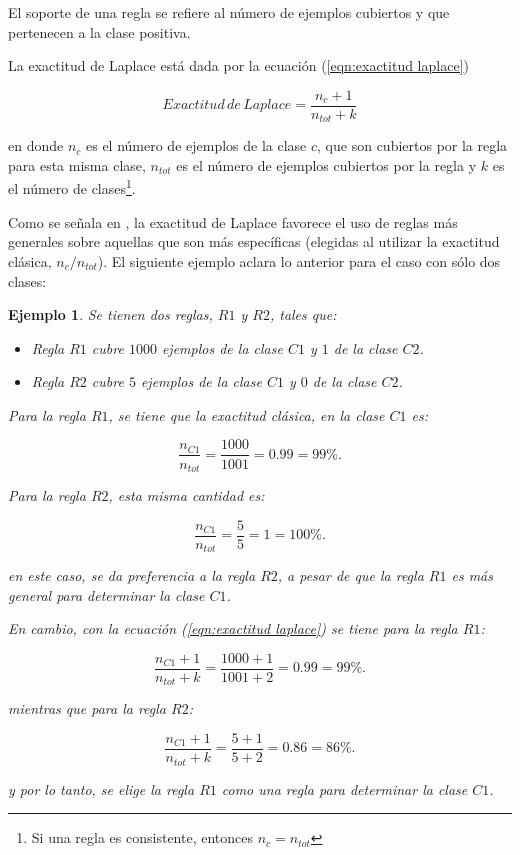 \documentclass[12pt]{report}
\theoremstyle{break}
\newtheorem{ejemplo}{Ejemplo}[chapter]
\theoremstyle{break}
\begin{document}
El soporte de una regla se refiere al número de ejemplos cubiertos y que pertenecen a la clase positiva.

La exactitud de Laplace está dada por la ecuación (\ref{eqn:exactitud laplace})

\begin{equation}\label{eqn:exactitud laplace}
Exactitud\,de\,Laplace = \dfrac{ n_{c} + 1 }{ n_{tot} + k }
\end{equation}

en donde $n_c$ es el número de ejemplos de la clase $c$, que son cubiertos por la regla para esta misma clase, $n_{tot}$ es el número de ejemplos cubiertos por la regla y $k$ es el número de clases\footnote{Si una regla es consistente, entonces $n_c = n_{tot}$}.

Como se señala en \cite{CN2Improvements}, la exactitud de Laplace favorece el uso de reglas más generales sobre aquellas que son más específicas (elegidas al utilizar la exactitud clásica, $n_{c} / n_{tot} $). El siguiente ejemplo aclara lo anterior para el caso con sólo dos clases:

\begin{ejemplo}
Se tienen dos reglas, $R1$ y $R2$, tales que:

\begin{itemize} 
\item Regla $R1$ cubre $1000$ ejemplos de la clase $C1$ y $1$ de la clase $C2$.

\item Regla $R2$ cubre $5$ ejemplos de la clase $C1$ y $0$ de la clase $C2$.
\end{itemize}

Para la regla $R1$, se tiene que la exactitud clásica, en la clase $C1$ es:

$$ \dfrac{n_{C1}}{n_{tot}} = \dfrac{1000}{1001} = 0.99 = 99\%.$$

Para la regla $R2$, esta misma cantidad es:

$$ \dfrac{n_{C1}}{n_{tot}} = \dfrac{5}{5} = 1 = 100\%.$$

en este caso, se da preferencia a la regla $R2$, a pesar de que la regla $R1$ es más general para determinar la clase $C1$.

En cambio, con la ecuación (\ref{eqn:exactitud laplace}) se tiene para la regla $R1$:

$$ \dfrac{n_{C1} + 1}{n_{tot} + k} = \dfrac{1000 + 1}{1001 + 2} = 0.99 = 99\%.$$

mientras que para la regla $R2$:

$$ \dfrac{n_{C1} + 1}{n_{tot} + k} = \dfrac{5 + 1}{5 + 2} = 0.86 = 86\%.$$

y por lo tanto, se elige la regla $R1$ como una regla para determinar la clase $C1$.

\end{ejemplo}
\end{document}
